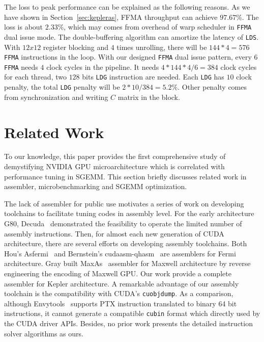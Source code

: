 \documentclass{sig-alternate-05-2015}
\begin{document}
The loss to peak performance can be explained as the following reasons. As we have shown in Section~\ref{sec:kepleras}, FFMA throughput can achieve $97.67\%$. The loss is about $2.33\%$, which may comes from overhead of warp scheduler in {\tt FFMA} dual issue mode. The double-buffering algorithm can amortize the latency of {\tt LDS}.
With $12x12$ register blocking and $4$ times unrolling, there will be $144*4=576$ {\tt FFMA} instructions in the loop.
With our designed {\tt FFMA} dual issue pattern, every $6$ {\tt FFMA} needs $4$ clock cycles in the pipeline.
It needs $4*144*4/6=384$ clock cycles for each thread,  two $128$ bits {\tt LDG} instruction are needed.
Each {\tt LDG} has $10$ clock penalty, the total {\tt LDG} penalty will be $2*10/384 = 5.2\%$. Other penalty comes from synchronization and writing $C$ matrix in the block.
%
\section{Related Work}
To our knowledge, this paper provides the first comprehensive study of demystifying NVIDIA GPU microarchitecture which is correlated with performance tuning in SGEMM. This section briefly discusses related work in assembler, microbenchmarking and SGEMM optimization.

The lack of assembler for public use motivates a series of work on developing toolchains to facilitate tuning codes in assembly level. For the early architecture G80, Decuda~\cite{decuda} demonstrated the feasibility to operate the limited number of assembly instructions. Then, for almost each new generation of CUDA architecture, there are several efforts on developing assembly toolchains. Both Hou's Asfermi~\cite{asfermi} and Bernstein's cudaasm-qhasm~\cite{bernstein2012usable} are assemblers for Fermi architecture. Gray built MaxAs~\cite{maxas} assembler for Maxwell architecture by reverse engineering the encoding of Maxwell GPU. Our work provide a complete assembler for Kepler architecture. A remarkable advantage of our assembly toolchain is the compatibility with CUDA's {\tt cuobjdump}. As a comparison, although Envytools~\cite{envytools} supports PTX instruction translated to binary 64 bit instructions, it cannot generate a compatible {\tt cubin} format which directly used by the CUDA driver APIs. Besides, no prior work presents the detailed instruction solver algorithms as ours.
\end{document}
